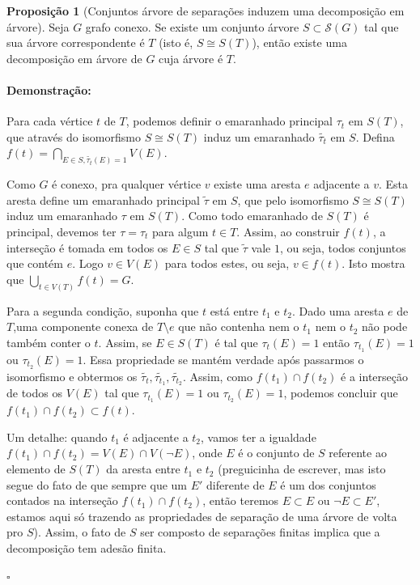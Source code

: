 \documentclass[11pt]{article}
\newcommand{\pulinho}{\vspace{.5cm}}
\theoremstyle{definition}
\theoremstyle{definition}
\theoremstyle{definition}
\newtheorem{prop}{Proposição}
\newenvironment{proposicao}{
\definecolor{shadecolor}{HTML}{FFDBDF}
\begin{shaded}
\begin{prop}
}
{
\end{prop}
\end{shaded}
}
\theoremstyle{definition}
\theoremstyle{definition}
\theoremstyle{definition}
\theoremstyle{definition}
\theoremstyle{definition}
\theoremstyle{definition}
\theoremstyle{definition}
\theoremstyle{definition}
\theoremstyle{definition}
\newenvironment{prova}{\paragraph{Demonstração:}}{\hfill$\square$ 
\pulinho
}
\theoremstyle{definition}
\begin{document}
\begin{proposicao}[Conjuntos árvore de separações induzem uma decomposição em árvore]
  Seja $G$ grafo conexo. Se existe um conjunto árvore $S \subset \mathcal{S}(G)$ tal que sua árvore correspondente é $T$ (isto é, $S \cong S(T)$), então existe uma decomposição em árvore de $G$ cuja árvore é $T$.
\end{proposicao}
\begin{prova}
Para cada vértice $t$ de $T$, podemos definir o emaranhado principal $\tau_t$ em $S(T)$, que através do isomorfismo $S \cong S(T)$ induz um emaranhado $\widetilde{\tau_t}$ em $S$. Defina $f(t) = \bigcap\limits_{E \in S, \widetilde{\tau_t}(E) = 1}^{}V(E)$. 

Como $G$ é conexo, pra qualquer vértice $v$ existe uma aresta $e$ adjacente a $v$. Esta aresta define um emaranhado principal $\tilde{\tau}$ em $S$, que pelo isomorfismo $S \cong S(T)$ induz um emaranhado $\tau$ em $S(T)$. Como todo emaranhado de $S(T)$ é principal, devemos ter $\tau = \tau_t$ para algum $t \in T$. Assim, ao construir $f(t)$, a interseção é tomada em todos os $E \in S$ tal que $\tilde{\tau}$ vale $1$, ou seja, todos conjuntos que contém $e$. Logo $v \in V(E)$ para todos estes, ou seja, $v \in f(t)$. Isto mostra que $\bigcup\limits_{t \in V(T)}^{}f(t) = G $.

Para a segunda condição, suponha que $t$ está entre $t_1$ e $t_2$. Dado uma aresta $e$ de $T$,uma componente conexa de $T \setminus e$ que não contenha nem o $t_1$ nem o $t_2$ não pode também conter o $t$. Assim, se $E \in S(T)$ é tal que $\tau_{t}(E) = 1$ então $\tau_{t_1}(E) = 1$ ou $\tau_{t_2}(E) = 1$. Essa propriedade se mantém verdade após passarmos o isomorfismo e obtermos os $\widetilde{\tau_{t}}, \widetilde{\tau_{t_1}}, \widetilde{\tau_{t_2}}$. Assim, como $f(t_1) \cap f(t_2)$ é a interseção de todos os $V(E)$ tal que $\tau_{t_1}(E) = 1$ ou $\tau_{t_2}(E) = 1$, podemos concluir que $f(t_1) \cap f(t_2) \subset f(t)$.

Um detalhe: quando $t_1$ é adjacente a $t_2$, vamos ter a igualdade $f(t_1) \cap f(t_2) = V(E) \cap V(\lnot E)$, onde $E$ é o conjunto de $S$ referente ao elemento de $S(T)$ da aresta entre $t_1$ e $t_2$ (preguicinha de escrever, mas isto segue do fato de que sempre que um $E'$ diferente de $E$ é um dos conjuntos contados na interseção $f(t_1) \cap f(t_2)$, então teremos $E \subset E$ ou $\lnot E \subset E'$, estamos aqui só trazendo as propriedades de separação de uma árvore de volta pro $S$). Assim, o fato de $S$ ser composto de separações finitas implica que a decomposição tem adesão finita.
  
\end{prova}
\end{document}
